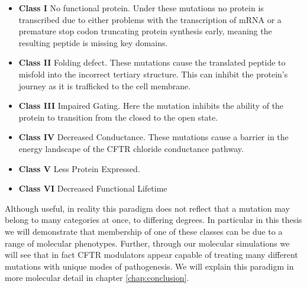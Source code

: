 \begin{itemize}
	\item \textbf{Class I} No functional protein. Under these mutations no protein is transcribed due to either problems with the transcription of mRNA or a premature stop codon truncating protein synthesis early, meaning the resulting peptide is missing key domains. 
	\item \textbf{Class II} Folding defect. These mutations cause the translated peptide to misfold into the incorrect tertiary structure. This can inhibit the protein's journey as it is trafficked to the cell membrane. 
	\item \textbf{Class III} Impaired Gating. Here the mutation inhibits the ability of the protein to transition from the closed to the open state. 
	\item \textbf{Class IV} Decreased Conductance. These mutations cause a barrier in the energy landscape of the CFTR chloride conductance pathway.
	\item \textbf{Class V} Less Protein Expressed.  
	\item \textbf{Class VI} Decreased Functional Lifetime

\end{itemize}

Although useful, in reality this paradigm does not reflect that a mutation may belong to many categories at once, to differing degrees. In particular in this thesis we will demonstrate that membership of one of these classes can be due to a range of molecular phenotypes. Further, through our molecular simulations we will see that in fact CFTR modulators appear capable of treating many different mutations with unique modes of pathogenesis. We will explain this paradigm in more molecular detail in chapter \ref{chap:conclusion}.


